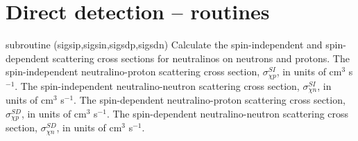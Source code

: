 \section{Direct detection -- routines}


\begin{sub}{subroutine (sigsip,sigsin,sigsdp,sigsdn)}
   Calculate the spin-independent and spin-dependent
  scattering cross sections for neutralinos on neutrons and protons.
   The spin-independent neutralino-proton scattering
  cross section, $\sigma^{SI}_{\chi p}$, in units of cm$^3$ s$^{-1}$.
   The spin-independent neutralino-neutron scattering
  cross section, $\sigma^{SI}_{\chi n}$, in units of cm$^3$ s$^{-1}$.
   The spin-dependent neutralino-proton scattering
  cross section, $\sigma^{SD}_{\chi p}$, in units of cm$^3$ s$^{-1}$.
   The spin-dependent neutralino-neutron scattering
  cross section, $\sigma^{SD}_{\chi n}$, in units of cm$^3$ s$^{-1}$.
\end{sub}




